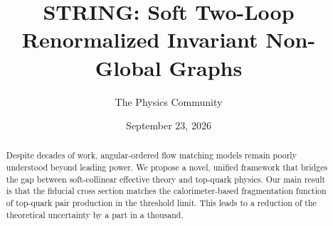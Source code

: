 \documentclass[11pt]{article}
\title{STRING: Soft Two-Loop Renormalized Invariant Non-Global Graphs}
\author{The Physics Community}
\date{September 23, 2026}
\numberwithin{equation}{section}
\theoremstyle{definition}
\theoremstyle{remark}
\begin{document}
\maketitle
\begin{abstract}
Despite decades of work, angular-ordered flow matching models remain
poorly understood beyond leading power. We propose a novel, unified
framework that bridges the gap between soft-collinear effective theory
and top-quark physics. Our main result is that the fiducial cross
section matches the calorimeter-based fragmentation function of
top-quark pair production in the threshold limit. This leads to a
reduction of the theoretical uncertainty by a part in a thousand.
\end{abstract}
\tableofcontents



\nocite{*}


\end{document}
